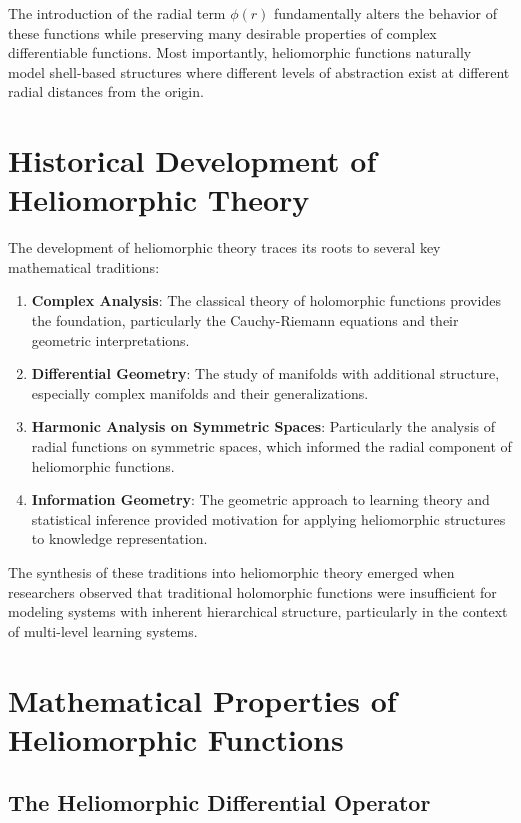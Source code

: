The introduction of the radial term $\phi(r)$ fundamentally alters the behavior of these functions while preserving many desirable properties of complex differentiable functions. Most importantly, heliomorphic functions naturally model shell-based structures where different levels of abstraction exist at different radial distances from the origin.

\section{Historical Development of Heliomorphic Theory}

The development of heliomorphic theory traces its roots to several key mathematical traditions:

\begin{enumerate}
    \item \textbf{Complex Analysis}: The classical theory of holomorphic functions provides the foundation, particularly the Cauchy-Riemann equations and their geometric interpretations.
    
    \item \textbf{Differential Geometry}: The study of manifolds with additional structure, especially complex manifolds and their generalizations.
    
    \item \textbf{Harmonic Analysis on Symmetric Spaces}: Particularly the analysis of radial functions on symmetric spaces, which informed the radial component of heliomorphic functions.
    
    \item \textbf{Information Geometry}: The geometric approach to learning theory and statistical inference provided motivation for applying heliomorphic structures to knowledge representation.
\end{enumerate}

The synthesis of these traditions into heliomorphic theory emerged when researchers observed that traditional holomorphic functions were insufficient for modeling systems with inherent hierarchical structure, particularly in the context of multi-level learning systems.

\section{Mathematical Properties of Heliomorphic Functions}

\subsection{The Heliomorphic Differential Operator}

